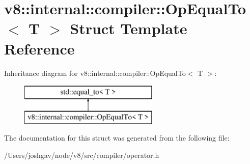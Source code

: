\hypertarget{structv8_1_1internal_1_1compiler_1_1_op_equal_to}{}\section{v8\+:\+:internal\+:\+:compiler\+:\+:Op\+Equal\+To$<$ T $>$ Struct Template Reference}
\label{structv8_1_1internal_1_1compiler_1_1_op_equal_to}
Inheritance diagram for v8\+:\+:internal\+:\+:compiler\+:\+:Op\+Equal\+To$<$ T $>$\+:\begin{figure}[H]
\begin{center}
\leavevmode
\includegraphics[height=2.000000cm]{structv8_1_1internal_1_1compiler_1_1_op_equal_to}
\end{center}
\end{figure}


The documentation for this struct was generated from the following file\+:\begin{DoxyCompactItemize}
\item 
/\+Users/joshgav/node/v8/src/compiler/operator.\+h\end{DoxyCompactItemize}
